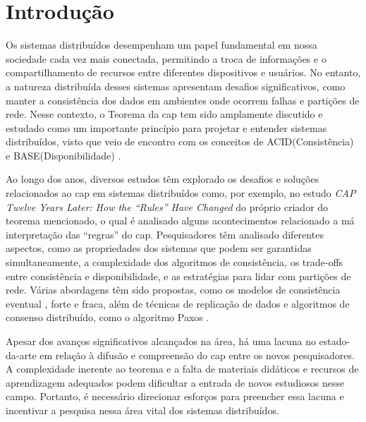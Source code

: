 
\chapter{Introdução}\label{cap:introducao}

Os sistemas distribuídos desempenham um papel fundamental em nossa sociedade cada vez mais conectada, permitindo a troca de informações e o compartilhamento de recursos entre diferentes dispositivos e usuários. No entanto, a natureza distribuída desses sistemas apresentam desafios significativos, como manter a consistência dos dados em ambientes onde ocorrem falhas e partições de rede. Nesse contexto, o Teorema da \gls{cap} tem sido amplamente discutido e estudado como um importante princípio para projetar e entender sistemas distribuídos, visto que veio de encontro com os conceitos de ACID(Consistência) e BASE(Disponibilidade) \cite{ConsistencyInACIDAndCAPTheoremStackOverFlow2013}.

Ao longo dos anos, diversos estudos têm explorado os desafios e soluções relacionados ao \gls{cap} em sistemas distribuídos como, por exemplo, no estudo \textit{CAP Twelve Years Later: How the ``Rules'' Have Changed} \cite{TwentyYearsLaterEricBrewer2012} do próprio criador do teorema mencionado, o qual é analisado alguns acontecimentos relacionado a má interpretação das ``regras''    do \gls{cap}. Pesquisadores têm analisado diferentes aspectos, como as propriedades dos sistemas que podem ser garantidas simultaneamente, a complexidade dos algoritmos de consistência, os trade-offs entre consistência e disponibilidade, e as estratégias para lidar com partições de rede. Várias abordagens têm sido propostas, como os modelos de consistência eventual \cite{EventuallyConsistentWernerVogels2009}, forte e fraca, além de técnicas de replicação de dados e algoritmos de consenso distribuído, como o algoritmo Paxos \cite{PaxosMadeSimpleLamport2001}.

Apesar dos avanços significativos alcançados na área, há uma lacuna no estado-da-arte em relação à difusão e compreensão do \gls{cap} entre os novos pesquisadores. A complexidade inerente ao teorema e a falta de materiais didáticos e recursos de aprendizagem adequados podem dificultar a entrada de novos estudiosos nesse campo. Portanto, é necessário direcionar esforços para preencher essa lacuna e incentivar a pesquisa nessa área vital dos sistemas distribuídos.

